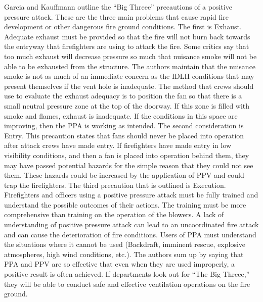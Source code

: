 \documentclass{article}
\begin{document}
\begin{appendices}
Garcia and Kauffmann outline the “Big Threee” precautions of a positive pressure attack. These are the three main problems that cause rapid fire development or other dangerous fire ground conditions. The first is Exhaust. Adequate exhaust must be provided so that the fire will not burn back towards the entryway that firefighters are using to attack the fire. Some critics say that too much exhaust will decrease pressure so much that nuisance smoke will not be able to be exhausted from the structure. The authors maintain that the nuisance smoke is not as much of an immediate concern as the IDLH conditions that may present themselves if the vent hole is inadequate. The method that crews should use to evaluate the exhaust adequacy is to position the fan so that there is a small neutral pressure zone at the top of the doorway. If this zone is filled with smoke and flames, exhaust is inadequate. If the conditions in this space are improving, then the PPA is working as intended. The second consideration is Entry. This precaution states that fans should never be placed into operation after attack crews have made entry. If firefighters have made entry in low visibility conditions, and then a fan is placed into operation behind them, they may have passed potential hazards for the simple reason that they could not see them. These hazards could be increased by the application of PPV and could trap the firefighters. The third precaution that is outlined is Execution. Firefighters and officers using a positive pressure attack must be fully trained and understand the possible outcomes of their actions. The training must be more comprehensive than training on the operation of the blowers. A lack of understanding of positive pressure attack can lead to an uncoordinated fire attack and can cause the deterioration of fire conditions. Users of PPA must understand the situations where it cannot be used (Backdraft, imminent rescue, explosive atmospheres, high wind conditions, etc.). The authors sum up by saying that PPA and PPV are so effective that even when they are used improperly, a positive result is often achieved. If departments look out for “The Big Threee,” they will be able to conduct safe and effective ventilation operations on the fire ground.\cite{BigThreee}


\end{appendices}
\end{document}
